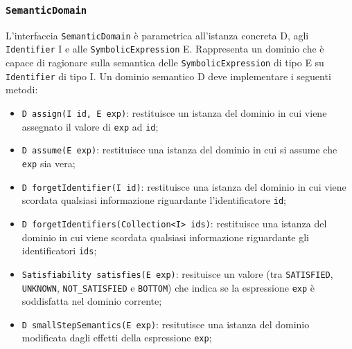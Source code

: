 \subsubsection{\texttt{SemanticDomain}}\label{subsec:semanticDomain}
L'interfaccia \texttt{SemanticDomain} è parametrica all'istanza concreta D, agli \texttt{Identifier} I e alle \texttt{SymbolicExpression} E. Rappresenta un dominio che è capace di ragionare sulla semantica delle \texttt{SymbolicExpression} di tipo E su \texttt{Identifier} di tipo I. Un dominio semantico D deve implementare i seguenti metodi:
\begin{itemize}
\setlength\itemsep{0.1em}
    \item \texttt{D assign(I id, E exp)}: restituisce un istanza del dominio in cui viene assegnato il valore di \texttt{exp} ad \texttt{id};
    \item \texttt{D assume(E exp)}: restituisce una istanza del dominio in cui si assume che \texttt{exp} sia vera;
    \item \texttt{D forgetIdentifier(I id)}: restituisce una istanza del dominio in cui viene scordata qualsiasi informazione riguardante l'identificatore \texttt{id};
    \item \texttt{D forgetIdentifiers(Collection<I> ids)}: restituisce una istanza del dominio in cui viene scordata qualsiasi informazione riguardante gli identificatori \texttt{ids};
    \item \texttt{Satisfiability satisfies(E exp)}: resituisce un valore (tra \texttt{SATISFIED}, \texttt{UNKNOWN}, \texttt{NOT\_SATISFIED} e \texttt{BOTTOM}) che indica se la espressione \texttt{exp} è soddisfatta nel dominio corrente;
    \item \texttt{D smallStepSemantics(E exp)}: resitutisce una istanza del dominio modificata dagli effetti della espressione \texttt{exp};
\end{itemize}

